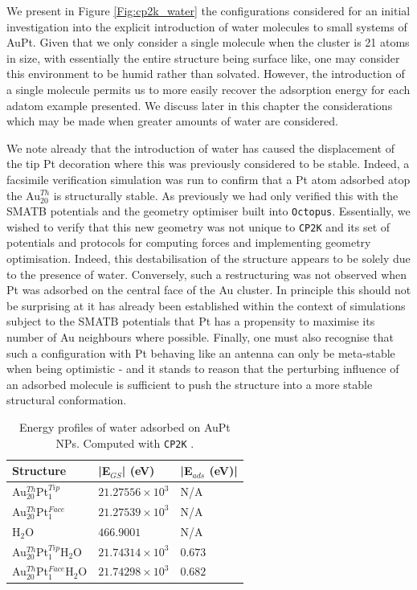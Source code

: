 We present in Figure \ref{Fig:cp2k_water} the configurations considered for an initial investigation into the explicit introduction of water molecules to small systems of AuPt. Given that we only consider a single molecule when the cluster is 21 atoms in size, with essentially the entire structure being surface like, one may consider this environment to be humid rather than solvated. However, the introduction of a single molecule permits us to more easily recover the adsorption energy for each adatom example presented. We discuss later in this chapter the considerations which may be made when greater amounts of water are considered.

We note already that the introduction of water has caused the displacement of the tip Pt decoration where this was previously considered to be stable. Indeed, a facsimile verification simulation was run to confirm that a Pt atom adsorbed atop the Au$_{20}^{Th}$ is structurally stable. As previously we had only verified this with the SMATB potentials and the geometry optimiser built into \texttt{Octopus}. Essentially, we wished to verify that this new geometry was not unique to \texttt{CP2K} and its set of potentials and protocols for computing forces and implementing geometry optimisation. Indeed, this destabilisation of the structure appears to be solely due to the presence of water. Conversely, such a restructuring was not observed when Pt was adsorbed on the central face of the Au cluster. In principle this should not be surprising at it has already been established within the context of simulations subject to the SMATB potentials that Pt has a propensity to maximise its number of Au neighbours where possible. Finally, one must also recognise that such a configuration with Pt behaving like an antenna can only be meta-stable when being optimistic - and it stands to reason that the perturbing influence of an adsorbed molecule is sufficient to push the structure into a more stable structural conformation.

\begin{table}[ht!]
\centering
\caption{Energy profiles of water adsorbed on AuPt NPs. Computed with \texttt{CP2K} \cite{cp2k_2020}.}
\label{tab:ads_cp2k}
\begin{tabular}{@{}lll@{}}
\toprule
Structure & |E$_{GS}$| (eV) & |E$_{ads}$ (eV)|     \\
\hline
Au$_{20}^{Th}$Pt$_{1}^{Tip}$           & $21.27556\times10^{3}$ & N/A    \\
Au$_{20}^{Th}$Pt$_{1}^{Face}$          & $21.27539\times10^{3}$ & N/A     \\
H$_{2}$O                               & $466.9001$ & N/A    \\
Au$_{20}^{Th}$Pt$_{1}^{Tip}$H$_{2}$O   & $21.74314\times10^{3}$ & $0.673$     \\
Au$_{20}^{Th}$Pt$_{1}^{Face}$H$_{2}$O  & $21.74298\times10^{3}$ & $0.682$    \\
\bottomrule
\end{tabular}
\end{table}

